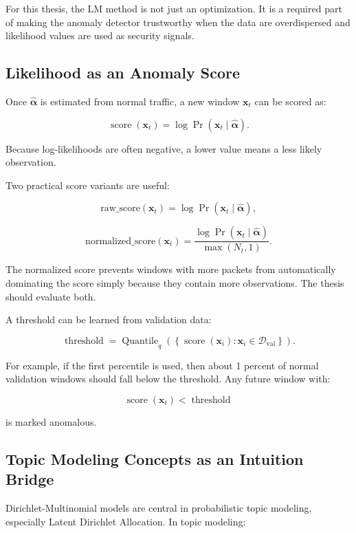 \documentclass[11pt,a4paper]{article}
\begin{document}
For this thesis, the LM method is not just an optimization. It is a required part of making the anomaly detector trustworthy when the data are overdispersed and likelihood values are used as security signals.

\subsection{Likelihood as an Anomaly Score}

Once \(\hat{\boldsymbol{\alpha}}\) is estimated from normal traffic, a new window \(\mathbf{x}_t\) can be scored as:

\[
\operatorname{score}(\mathbf{x}_t)=\log\Pr(\mathbf{x}_t\mid\hat{\boldsymbol{\alpha}}).
\]

Because log-likelihoods are often negative, a lower value means a less likely observation.

Two practical score variants are useful:

\[
\mathrm{raw\_score}(\mathbf{x}_t)
=
\log\Pr(\mathbf{x}_t\mid\hat{\boldsymbol{\alpha}}),
\]

\[
\mathrm{normalized\_score}(\mathbf{x}_t)
=
\frac{\log\Pr(\mathbf{x}_t\mid\hat{\boldsymbol{\alpha}})}{\max(N_t,1)}.
\]

The normalized score prevents windows with more packets from automatically dominating the score simply because they contain more observations. The thesis should evaluate both.

A threshold can be learned from validation data:

\[
\operatorname{threshold}
=
\operatorname{Quantile}_q\left(
\left\{\operatorname{score}(\mathbf{x}_i):\mathbf{x}_i\in\mathcal{D}_{\mathrm{val}}\right\}
\right).
\]

For example, if the first percentile is used, then about 1 percent of normal validation windows should fall below the threshold. Any future window with:

\[
\operatorname{score}(\mathbf{x}_t)<\operatorname{threshold}
\]

is marked anomalous.

\subsection{Topic Modeling Concepts as an Intuition Bridge}

Dirichlet-Multinomial models are central in probabilistic topic modeling, especially Latent Dirichlet Allocation. In topic modeling:
\end{document}
